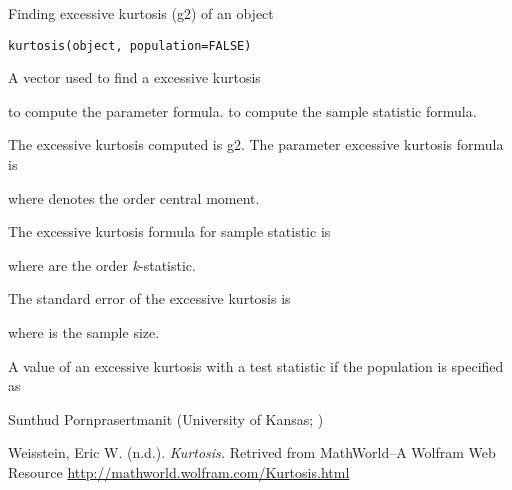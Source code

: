 \documentclass[a4paper]{book}
\begin{document}
%
\begin{Description}\relax
Finding excessive kurtosis (g2) of an object
\end{Description}
%
\begin{Usage}
\begin{verbatim}
kurtosis(object, population=FALSE)
\end{verbatim}
\end{Usage}
%
\begin{Arguments}
\begin{ldescription}
\item[\code{object}] 
A vector used to find a excessive kurtosis

\item[\code{population}] 
 to compute the parameter formula.  to compute the sample statistic formula.

\end{ldescription}
\end{Arguments}
%
\begin{Details}\relax
The excessive kurtosis computed is g2. The parameter excessive kurtosis  formula is


where  denotes the  order central moment.

The excessive kurtosis formula for sample statistic  is


where  are the  order \emph{k}-statistic.

The standard error of the excessive kurtosis is 


where  is the sample size.
\end{Details}
%
\begin{Value}
A value of an excessive kurtosis with a test statistic if the population is specified as 
\end{Value}
%
\begin{Author}\relax
Sunthud Pornprasertmanit (University of Kansas; )
\end{Author}
%
\begin{References}\relax
Weisstein, Eric W. (n.d.). \emph{Kurtosis.} Retrived from MathWorld--A Wolfram Web Resource \url{http://mathworld.wolfram.com/Kurtosis.html} 
\end{References}
\end{document}
